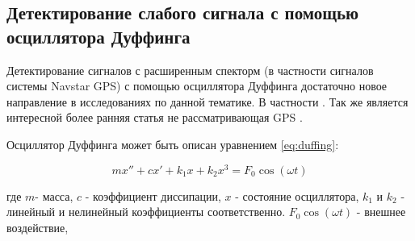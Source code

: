 \subsection{Детектирование слабого сигнала с помощью осциллятора Дуффинга}
\label{ch:duffing}

Детектирование сигналов с расширенным спекторм (в частности сигналов системы Navstar GPS) с помощью осциллятора Дуффинга
достаточно новое направление в исследованиях по данной тематике. В частности
\cite{chaos_chen, chaos_cambridge, chaos_huang, chaos_song}. Так же является интересной более ранняя статья не рассматривающая GPS
\cite{chaos_wang}.

Осциллятор Дуффинга может быть описан уравнением \ref{eq:duffing}:

\begin{center}
\begin{equation}
	\label{eq:duffing}
	mx'' + cx' + k_{1}x + k_{2}x^3 = F_{0}\cos(\omega{t})
\end{equation}
\end{center}

где
$m$- масса,
$c$ - коэффициент диссипации,
$x$ - состояние осциллятора,
$k_1$ и $k_2$ - линейный и нелинейный коэффициенты соответственно.
$F_{0}\cos(\omega{t})$ - внешнее воздействие,

\newpage
